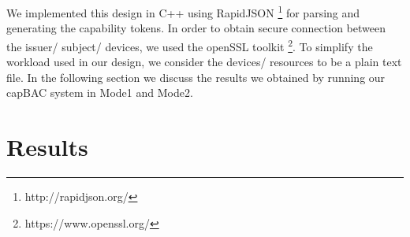 We implemented this design in C++ using RapidJSON \footnote{http://rapidjson.org/} for parsing and generating the capability tokens. In order to obtain secure connection between the issuer/ subject/ devices, we used the openSSL toolkit \footnote{https://www.openssl.org/}. To simplify the workload used in our design, we consider the devices/ resources to be a plain text file. In the following section we discuss the results we obtained by running our capBAC system in Mode1 and Mode2. 

\section{Results}
\label{sec:results}

